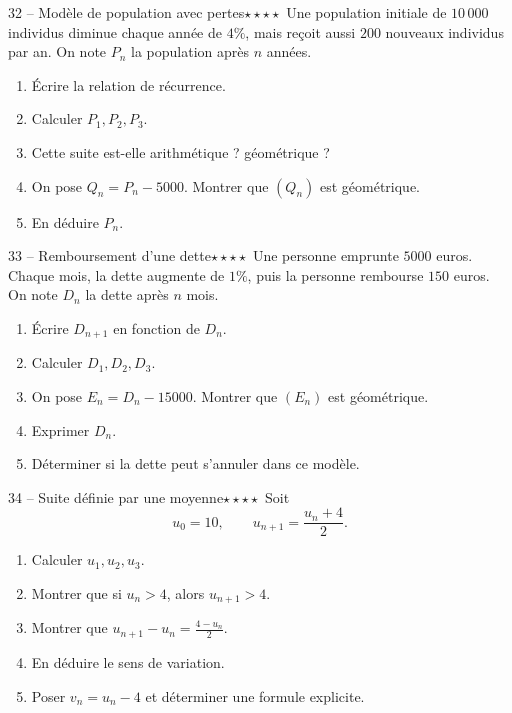 \documentclass[11pt,a4paper]{article}
\newcommand{\quatreetoiles}{\(\star\star\star\star\)}
\begin{document}
\begin{exobox}{32 -- Modèle de population avec pertes}{\quatreetoiles}
Une population initiale de \(10\,000\) individus diminue chaque année de \(4\%\), mais reçoit aussi \(200\) nouveaux individus par an. On note \(P_n\) la population après \(n\) années.
\begin{enumerate}[label=\alph*)]
  \item Écrire la relation de récurrence.
  \item Calculer \(P_1,P_2,P_3\).
  \item Cette suite est-elle arithmétique ? géométrique ?
  \item On pose \(Q_n=P_n-5000\). Montrer que \((Q_n)\) est géométrique.
  \item En déduire \(P_n\).
\end{enumerate}
\end{exobox}

\begin{exobox}{33 -- Remboursement d'une dette}{\quatreetoiles}
Une personne emprunte \(5000\) euros. Chaque mois, la dette augmente de \(1\%\), puis la personne rembourse \(150\) euros. On note \(D_n\) la dette après \(n\) mois.
\begin{enumerate}[label=\alph*)]
  \item Écrire \(D_{n+1}\) en fonction de \(D_n\).
  \item Calculer \(D_1,D_2,D_3\).
  \item On pose \(E_n=D_n-15000\). Montrer que \((E_n)\) est géométrique.
  \item Exprimer \(D_n\).
  \item Déterminer si la dette peut s'annuler dans ce modèle.
\end{enumerate}
\end{exobox}

\begin{exobox}{34 -- Suite définie par une moyenne}{\quatreetoiles}
Soit
\[
u_0=10,\qquad u_{n+1}=\frac{u_n+4}{2}.
\]
\begin{enumerate}[label=\alph*)]
  \item Calculer \(u_1,u_2,u_3\).
  \item Montrer que si \(u_n>4\), alors \(u_{n+1}>4\).
  \item Montrer que \(u_{n+1}-u_n=\frac{4-u_n}{2}\).
  \item En déduire le sens de variation.
  \item Poser \(v_n=u_n-4\) et déterminer une formule explicite.
\end{enumerate}
\end{exobox}
\end{document}
